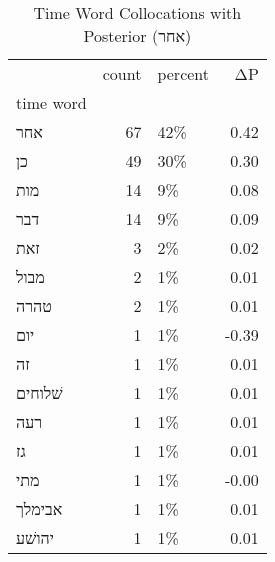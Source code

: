 \begin{table}[htbp!]
\centering
\caption{Time Word Collocations with Posterior (אחר)}
\label{table:postאחר_head_cpd}
\begin{tabular}{lrlr}
\toprule
{} &  count & percent &    ΔP \\
time word &        &         &       \\
\midrule
אחר       &     67 &     42\% &  0.42 \\
כן        &     49 &     30\% &  0.30 \\
מות       &     14 &      9\% &  0.08 \\
דבר       &     14 &      9\% &  0.09 \\
זאת       &      3 &      2\% &  0.02 \\
מבול      &      2 &      1\% &  0.01 \\
טהרה      &      2 &      1\% &  0.01 \\
יום       &      1 &      1\% & -0.39 \\
זה        &      1 &      1\% &  0.01 \\
שׁלוחים   &      1 &      1\% &  0.01 \\
רעה       &      1 &      1\% &  0.01 \\
גז        &      1 &      1\% &  0.01 \\
מתי       &      1 &      1\% & -0.00 \\
אבימלך    &      1 &      1\% &  0.01 \\
יהושׁע    &      1 &      1\% &  0.01 \\
\bottomrule
\end{tabular}
\end{table}
